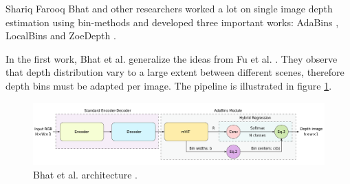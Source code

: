 \newpage
Shariq Farooq Bhat and other researchers worked a lot on single image depth estimation using bin-methods and developed three important works: AdaBins \cite{AdaBins}, LocalBins \cite{LocalBins} and ZoeDepth \cite{ZoeDepth}.

In the first work, Bhat et al. \cite{AdaBins} generalize the ideas from Fu et al. \cite{ordinal_regression}.
They observe that depth distribution vary to a large extent between different scenes, therefore depth bins must be adapted per image.
The pipeline is illustrated in figure \ref{fig:adabins}.

\begin{figure}
	\centering
	\includegraphics[scale=0.35]{figs/adabins}
	\caption{Bhat et al. architecture \cite{AdaBins}. \label{fig:adabins}}
\end{figure}

